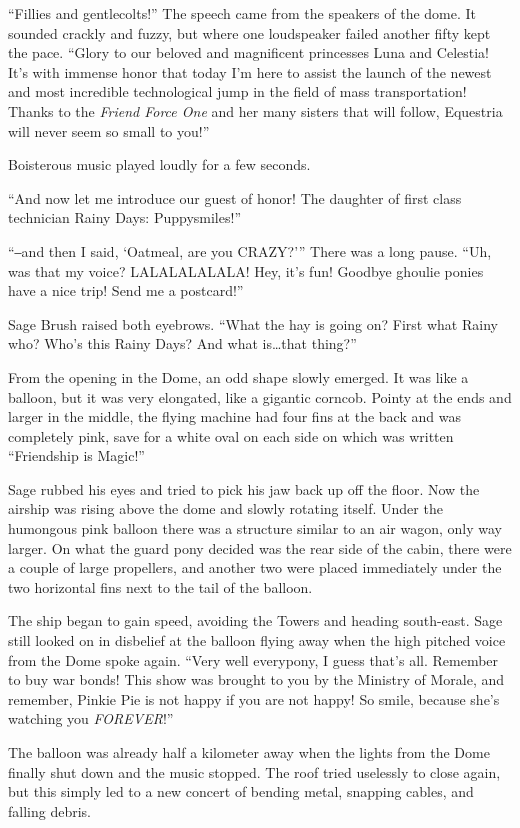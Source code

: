 ``Fillies and gentlecolts!'' The speech came from the speakers of the dome. It sounded crackly and fuzzy, but where one loudspeaker failed another fifty kept the pace. ``Glory to our beloved and magnificent princesses Luna and Celestia! It's with immense honor that today I'm here to assist the launch of the newest and most incredible technological jump in the field of mass transportation! Thanks to the \emph{Friend Force One}\/ and her many sisters that will follow, Equestria will never seem so small to you!''

Boisterous music played loudly for a few seconds.

``And now let me introduce our guest of honor! The daughter of first class technician Rainy Days: Puppysmiles!''

``‒and then I said, `Oatmeal, are you CRAZY?''' There was a long pause. ``Uh, was that my voice? LALALALALALA! Hey, it's fun! Goodbye ghoulie ponies have a nice trip! Send me a postcard!''

Sage Brush raised both eyebrows. ``What the hay is going on? First what Rainy who? Who's this Rainy Days? And what is\dots that thing?''

From the opening in the Dome, an odd shape slowly emerged. It was like a balloon, but it was very elongated, like a gigantic corncob. Pointy at the ends and larger in the middle, the flying machine had four fins at the back and was completely pink, save for a white oval on each side on which was written ``Friendship is Magic!''

Sage rubbed his eyes and tried to pick his jaw back up off the floor. Now the airship was rising above the dome and slowly rotating itself. Under the humongous pink balloon there was a structure similar to an air wagon, only way larger. On what the guard pony decided was the rear side of the cabin, there were a couple of large propellers, and another two were placed immediately under the two horizontal fins next to the tail of the balloon.

The ship began to gain speed, avoiding the Towers and heading south-east. Sage still looked on in disbelief at the balloon flying away when the high pitched voice from the Dome spoke again. ``Very well everypony, I guess that's all. Remember to buy war bonds! This show was brought to you by the Ministry of Morale, and remember, Pinkie Pie is not happy if you are not happy! So smile, because she's watching you \emph{FOREVER}\/!''

The balloon was already half a kilometer away when the lights from the Dome finally shut down and the music stopped. The roof tried uselessly to close again, but this simply led to a new concert of bending metal, snapping cables, and falling debris.

